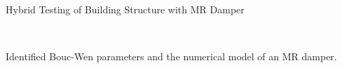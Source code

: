 \documentclass[usepdftitle=false]{beamer}
\begin{document}
\begin{frame}{Hybrid Testing of Building Structure with MR Damper}
\begin{figure}[H]
\centering
\setcounter{subfigure}{0}
\\

\label{fig:8-13}
\end{figure}
Identified Bouc-Wen parameters and the numerical model of an MR damper.
\end{frame}
\end{document}
